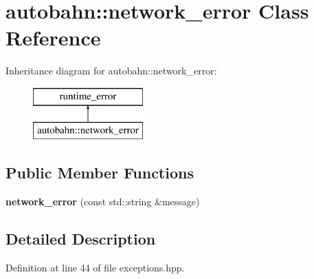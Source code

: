 \hypertarget{classautobahn_1_1network__error}{}\section{autobahn\+:\+:network\+\_\+error Class Reference}
\label{classautobahn_1_1network__error}
Inheritance diagram for autobahn\+:\+:network\+\_\+error\+:\begin{figure}[H]
\begin{center}
\leavevmode
\includegraphics[height=2.000000cm]{classautobahn_1_1network__error}
\end{center}
\end{figure}
\subsection*{Public Member Functions}
\begin{DoxyCompactItemize}
\item 
{\bfseries network\+\_\+error} (const std\+::string \&message)\hypertarget{classautobahn_1_1network__error_af9986124fda16649efc93e0037deb630}{}\label{classautobahn_1_1network__error_af9986124fda16649efc93e0037deb630}

\end{DoxyCompactItemize}


\subsection{Detailed Description}


Definition at line 44 of file exceptions.\+hpp.


